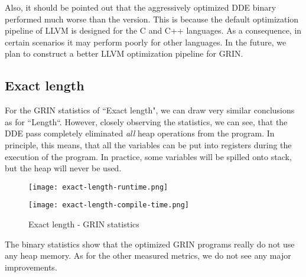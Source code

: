 \documentclass[main.tex]{subfiles}
\begin{document}
	Also, it should be pointed out that the aggressively optimized DDE binary performed much worse than the  version. This is because the default optimization pipeline of LLVM is designed for the C and C++ languages. As a consequence, in certain scenarios it may perform poorly for other languages. In the future, we plan to construct a better LLVM optimization pipeline for GRIN.

	\subsection{Exact length}
	
	For the GRIN statistics of ``Exact length", we can draw very similar conclusions as for ``Length``. However, closely observing the statistics, we can see, that the DDE pass completely eliminated \emph{all} heap operations from the program. In principle, this means, that all the variables can be put into registers during the execution of the program. In practice, some variables will be spilled onto stack, but the heap will never be used.

	\begin{figure}[h]
		\hspace{-0.5cm}
		\renewcommand{\figurename}{Diagram}
		\caption{Exact length - GRIN statistics}
		\label{diagram:exact-length-stats}
		\addtocounter{figure}{-1}
		\begin{minipage}{0.5\textwidth}
			\label{diagram:exact-length-stats-rt}
			\texttt{[image: exact-length-runtime.png]}
		\end{minipage}
		\begin{minipage}{0.5\textwidth}
			\label{diagram:exact-length-stats-ct}
			\texttt{[image: exact-length-compile-time.png]}
		\end{minipage}
	\end{figure}

	The binary statistics show that the optimized GRIN programs really do not use any heap memory. As for the other measured metrics, we do not see any major improvements.
\end{document}
